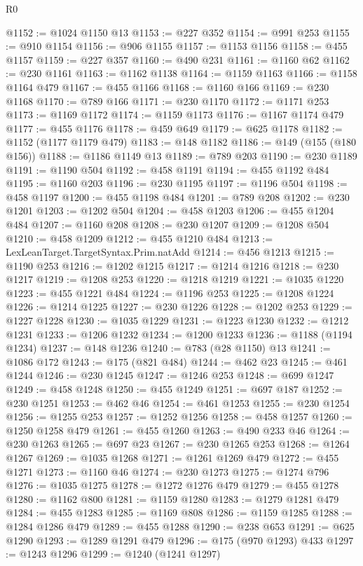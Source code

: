 \begin{lexlean}{R0}
\begin{coremodule}
@1152 := @1024 @1150 @13
@1153 := @227 @352
@1154 := @991 @253
@1155 := @910 @1154
@1156 := @906 @1155
@1157 := @1153 @1156
@1158 := @455 @1157
@1159 := @227 @357
@1160 := @490 @231
@1161 := @1160 @62
@1162 := @230 @1161
@1163 := @1162 @1138
@1164 := @1159 @1163
@1166 := @1158 @1164 @479
@1167 := @455 @1166
@1168 := @1160 @166
@1169 := @230 @1168
@1170 := @789 @166
@1171 := @230 @1170
@1172 := @1171 @253
@1173 := @1169 @1172
@1174 := @1159 @1173
@1176 := @1167 @1174 @479
@1177 := @455 @1176
@1178 := @459 @649
@1179 := @625 @1178
@1182 := @1152 (@1177 @1179 @479)
@1183 := @148 @1182
@1186 := @149 (@155 (@180 @156))
@1188 := @1186 @1149 @13
@1189 := @789 @203
@1190 := @230 @1189
@1191 := @1190 @504
@1192 := @458 @1191
@1194 := @455 @1192 @484
@1195 := @1160 @203
@1196 := @230 @1195
@1197 := @1196 @504
@1198 := @458 @1197
@1200 := @455 @1198 @484
@1201 := @789 @208
@1202 := @230 @1201
@1203 := @1202 @504
@1204 := @458 @1203
@1206 := @455 @1204 @484
@1207 := @1160 @208
@1208 := @230 @1207
@1209 := @1208 @504
@1210 := @458 @1209
@1212 := @455 @1210 @484
@1213 := LexLeanTarget.TargetSyntax.Prim.natAdd
@1214 := @456 @1213
@1215 := @1190 @253
@1216 := @1202 @1215
@1217 := @1214 @1216
@1218 := @230 @1217
@1219 := @1208 @253
@1220 := @1218 @1219
@1221 := @1035 @1220
@1223 := @455 @1221 @484
@1224 := @1196 @253
@1225 := @1208 @1224
@1226 := @1214 @1225
@1227 := @230 @1226
@1228 := @1202 @253
@1229 := @1227 @1228
@1230 := @1035 @1229
@1231 := @1223 @1230
@1232 := @1212 @1231
@1233 := @1206 @1232
@1234 := @1200 @1233
@1236 := @1188 (@1194 @1234)
@1237 := @148 @1236
@1240 := @783 (@28 @1150) @13
@1241 := @1086 @172
@1243 := @175 (@821 @484)
@1244 := @462 @23
@1245 := @461 @1244
@1246 := @230 @1245
@1247 := @1246 @253
@1248 := @699 @1247
@1249 := @458 @1248
@1250 := @455 @1249
@1251 := @697 @187
@1252 := @230 @1251
@1253 := @462 @46
@1254 := @461 @1253
@1255 := @230 @1254
@1256 := @1255 @253
@1257 := @1252 @1256
@1258 := @458 @1257
@1260 := @1250 @1258 @479
@1261 := @455 @1260
@1263 := @490 @233 @46
@1264 := @230 @1263
@1265 := @697 @23
@1267 := @230 @1265 @253
@1268 := @1264 @1267
@1269 := @1035 @1268
@1271 := @1261 @1269 @479
@1272 := @455 @1271
@1273 := @1160 @46
@1274 := @230 @1273
@1275 := @1274 @796
@1276 := @1035 @1275
@1278 := @1272 @1276 @479
@1279 := @455 @1278
@1280 := @1162 @800
@1281 := @1159 @1280
@1283 := @1279 @1281 @479
@1284 := @455 @1283
@1285 := @1169 @808
@1286 := @1159 @1285
@1288 := @1284 @1286 @479
@1289 := @455 @1288
@1290 := @238 @653
@1291 := @625 @1290
@1293 := @1289 @1291 @479
@1296 := @175 (@970 @1293) @433
@1297 := @1243 @1296
@1299 := @1240 (@1241 @1297)

\end{coremodule}
\end{lexlean}
